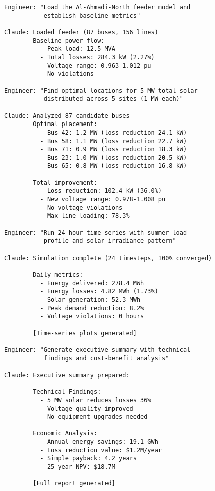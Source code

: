 \documentclass[review]{elsarticle}
\begin{document}
\begin{lstlisting}[caption={Conversational analysis workflow},label={lst:conversation}]
Engineer: "Load the Al-Ahmadi-North feeder model and
           establish baseline metrics"

Claude: Loaded feeder (87 buses, 156 lines)
        Baseline power flow:
          - Peak load: 12.5 MVA
          - Total losses: 284.3 kW (2.27%)
          - Voltage range: 0.963-1.012 pu
          - No violations

Engineer: "Find optimal locations for 5 MW total solar
           distributed across 5 sites (1 MW each)"

Claude: Analyzed 87 candidate buses
        Optimal placement:
          - Bus 42: 1.2 MW (loss reduction 24.1 kW)
          - Bus 58: 1.1 MW (loss reduction 22.7 kW)
          - Bus 71: 0.9 MW (loss reduction 18.3 kW)
          - Bus 23: 1.0 MW (loss reduction 20.5 kW)
          - Bus 65: 0.8 MW (loss reduction 16.8 kW)

        Total improvement:
          - Loss reduction: 102.4 kW (36.0%)
          - New voltage range: 0.978-1.008 pu
          - No voltage violations
          - Max line loading: 78.3%

Engineer: "Run 24-hour time-series with summer load
           profile and solar irradiance pattern"

Claude: Simulation complete (24 timesteps, 100% converged)

        Daily metrics:
          - Energy delivered: 278.4 MWh
          - Energy losses: 4.82 MWh (1.73%)
          - Solar generation: 52.3 MWh
          - Peak demand reduction: 8.2%
          - Voltage violations: 0 hours

        [Time-series plots generated]

Engineer: "Generate executive summary with technical
           findings and cost-benefit analysis"

Claude: Executive summary prepared:

        Technical Findings:
          - 5 MW solar reduces losses 36%
          - Voltage quality improved
          - No equipment upgrades needed

        Economic Analysis:
          - Annual energy savings: 19.1 GWh
          - Loss reduction value: $1.2M/year
          - Simple payback: 4.2 years
          - 25-year NPV: $18.7M

        [Full report generated]
\end{lstlisting}
\end{document}
